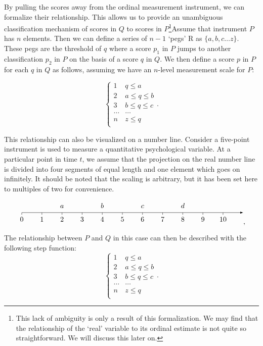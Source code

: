 \documentclass[utf8]{FrontiersinVancouver}
\begin{document}
By pulling the scores away from the ordinal measurement instrument, we can formalize their relationship. This allows us to provide an unambiguous classification mechanism of scores in $Q$ to scores in $P$\footnote{This lack of ambiguity is only a result of this formalization. We may find that the relationship of the `real' variable to its ordinal estimate is not quite so straightforward. We will discuss this later on.}Assume that instrument $P$ has $n$ elements. Then we can define a series of $n - 1$ `pegs' R as $\{ a, b, c \ldots z \}$. These pegs are the threshold of $q$ where a score $p_1$ in $P$ jumps to another classification $p_2$ in $P$ on the basis of a score $q$ in $Q$. We then define a score $p$ in $P$ for each $q$ in $Q$ as follows, assuming we have an $n$-level measurement scale for $P$:

\[
\begin{cases} 
    1 & q \leq a\\
    2 & a \leq q \leq b\\
    3 & b \leq q \leq c\\
    \ldots & \ldots\\    
    n & z\leq q\\
\end{cases}.
\]

This relationship can also be visualized on a number line. Consider a five-point instrument is used to measure a quantitative psychological variable. At a particular point in time $t$, we assume that the projection on the real number line is divided into four segments of equal length and one element which goes on infinitely. It should be noted that the scaling is arbitrary, but it has been set here to multiples of two for convenience. 

\[
\begin{tikzpicture}
    \draw[-latex] (0,0) -- (11,0);
    \foreach \x in {0,...,10}
        \draw (\x,0) -- (\x,-3pt);
    \foreach \x in {0,...,10}
        \node [below] at (\x,-0.1) {$\x$};
    \foreach \x\y in {2/a,4/b,6/c,8/d}
        \node [above] at (\x,0.1) {$\y$};
\end{tikzpicture},
\]

The relationship between $P$ and $Q$ in this case can then be described with the following step function:
\[
\begin{cases} 
    1 & q \leq a\\
    2 & a \leq q \leq b\\
    3 & b \leq q \leq c\\
    \ldots & \ldots\\    
    n & z\leq q\\
\end{cases}.
\]
\end{document}
